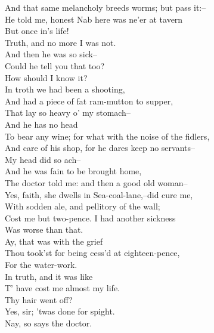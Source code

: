 \documentclass{memoir}
\begin{document}
\begin{drama*}
 And that same melancholy breeds worms; but pass it:--\\
 He told me, honest Nab here was ne'er at tavern\\
 But once in's life!\\
\druggerspeaks {} Truth, and no more I was not.\\
\facespeaks  And then he was so sick--\\
\druggerspeaks {} Could he tell you that too?\\
\facespeaks  How should I know it?\\
\druggerspeaks {} In troth we had been a shooting,\\
 And had a piece of fat ram-mutton to supper,\\
 That lay so heavy o' my stomach--\\
\facespeaks {} And he has no head\\
 To bear any wine; for what with the noise of the fidlers,\\
 And care of his shop, for he dares keep no servants--\\
\druggerspeaks  My head did so ach--\\
\facespeaks {} And he was fain to be brought home,\\
 The doctor told me: and then a good old woman--\\
\druggerspeaks  Yes, faith, she dwells in Sea-coal-lane,--did cure me,\\
 With sodden ale, and pellitory of the wall;\\
 Cost me but two-pence. I had another sickness\\
 Was worse than that.\\
\facespeaks {} Ay, that was with the grief\\
 Thou took'st for being cess'd at eighteen-pence,\\
 For the water-work.\\
\druggerspeaks {} In truth, and it was like\\
 T' have cost me almost my life.\\
\facespeaks {} Thy hair went off?\\
\druggerspeaks  Yes, sir; 'twas done for spight.\\
\facespeaks {} Nay, so says the doctor.\\

\end{drama*}
\end{document}

